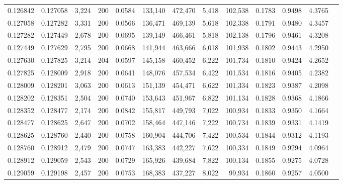 \begin{tabular}{rrrrrrrrrrrrr}
0.126842 & 0.127058 &  3,224 & 200 &                                     0.0584 & 133,140 & 472,470 &   5,418 & 102,538 & 0.1783 & 0.9498 & 4.3765 \\
0.127058 & 0.127282 &  3,331 & 200 &                                     0.0566 & 136,471 & 469,139 &   5,618 & 102,338 & 0.1791 & 0.9480 & 4.3457 \\
0.127282 & 0.127449 &  2,678 & 200 &                                     0.0695 & 139,149 & 466,461 &   5,818 & 102,138 & 0.1796 & 0.9461 & 4.3208 \\
0.127449 & 0.127629 &  2,795 & 200 &                                     0.0668 & 141,944 & 463,666 &   6,018 & 101,938 & 0.1802 & 0.9443 & 4.2950 \\
0.127630 & 0.127825 &  3,214 & 204 &                                     0.0597 & 145,158 & 460,452 &   6,222 & 101,734 & 0.1810 & 0.9424 & 4.2652 \\
0.127825 & 0.128009 &  2,918 & 200 &                                     0.0641 & 148,076 & 457,534 &   6,422 & 101,534 & 0.1816 & 0.9405 & 4.2382 \\
0.128009 & 0.128201 &  3,063 & 200 &                                     0.0613 & 151,139 & 454,471 &   6,622 & 101,334 & 0.1823 & 0.9387 & 4.2098 \\
0.128202 & 0.128351 &  2,504 & 200 &                                     0.0740 & 153,643 & 451,967 &   6,822 & 101,134 & 0.1828 & 0.9368 & 4.1866 \\
0.128352 & 0.128477 &  2,174 & 200 &                                     0.0842 & 155,817 & 449,793 &   7,022 & 100,934 & 0.1833 & 0.9350 & 4.1664 \\
0.128477 & 0.128625 &  2,647 & 200 &                                     0.0702 & 158,464 & 447,146 &   7,222 & 100,734 & 0.1839 & 0.9331 & 4.1419 \\
0.128625 & 0.128760 &  2,440 & 200 &                                     0.0758 & 160,904 & 444,706 &   7,422 & 100,534 & 0.1844 & 0.9312 & 4.1193 \\
0.128760 & 0.128912 &  2,479 & 200 &                                     0.0747 & 163,383 & 442,227 &   7,622 & 100,334 & 0.1849 & 0.9294 & 4.0964 \\
0.128912 & 0.129059 &  2,543 & 200 &                                     0.0729 & 165,926 & 439,684 &   7,822 & 100,134 & 0.1855 & 0.9275 & 4.0728 \\
0.129059 & 0.129198 &  2,457 & 200 &                                     0.0753 & 168,383 & 437,227 &   8,022 &  99,934 & 0.1860 & 0.9257 & 4.0500 \\

\end{tabular}
